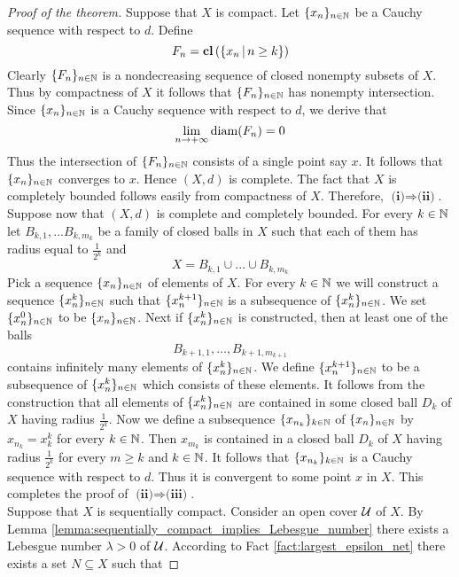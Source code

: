 \begin{proof}[Proof of the theorem]
Suppose that $X$ is compact. Let $\{x_n\}_{n\in {\mathbb N}}$ be a Cauchy sequence with respect to $d$. Define 
$$F_n = \mathbf{cl}\left(\{x_n\,|\,n \geq k\}\right)$$
Clearly $\{F_n\}_{n\in {\mathbb N}}$ is a nondecreasing sequence of closed nonempty subsets of $X$. Thus by compactness of $X$ it follows that $\{F_n\}_{n\in {\mathbb N}}$ has nonempty intersection. Since $\{x_n\}_{n\in {\mathbb N}}$ is a Cauchy sequence with respect to $d$, we derive that
$$\lim_{n\rightarrow +\infty}\mathrm{diam}(F_n) = 0$$
Thus the intersection of $\{F_n\}_{n\in {\mathbb N}}$ consists of a single point say $x$. It follows that $\{x_n\}_{n\in {\mathbb N}}$ converges to $x$. Hence $(X,d)$ is complete. The fact that $X$ is completely bounded follows easily from compactness of $X$. Therefore, $\textbf{(i)}\Rightarrow \textbf{(ii)}$.\\
Suppose now that $(X,d)$ is complete and completely bounded. For every $k\in {\mathbb N}$ let $B_{k,1},...B_{k,m_k}$ be a family of closed balls in $X$ such that each of them has radius equal to $\frac{1}{2^k}$ and
$$X = B_{k,1}\cup ...\cup B_{k,m_k}$$
Pick a sequence $\{x_n\}_{n\in {\mathbb N}}$ of elements of $X$. For every $k \in {\mathbb N}$ we will construct a sequence $\{x^{k}_n\}_{n\in {\mathbb N}}$ such that $\{x^{k+1}_n\}_{n\in {\mathbb N}}$ is a subsequence of $\{x^{k}_{n}\}_{n \in {\mathbb N}}$. We set $\{x^{0}_n\}_{n\in {\mathbb N}}$ to be $\{x_n\}_{n\in {\mathbb N}}$. Next if $\{x^k_n\}_{n\in {\mathbb N}}$ is constructed, then at least one of the balls 
$$B_{k+1,1},...,B_{k+1,m_{k+1}}$$
contains infinitely many elements of $\{x^k_n\}_{n\in {\mathbb N}}$. We define $\{x^{k+1}_n\}_{n\in {\mathbb N}}$ to be a subsequence of $\{x^k_n\}_{n\in {\mathbb N}}$ which consists of these elements. It follows from the construction that all elements of $\{x^k_n\}_{n\in {\mathbb N}}$ are contained in some closed ball $D_k$ of $X$ having radius $\frac{1}{2^{k}}$. Now we define a subsequence $\{x_{n_k}\}_{k\in {\mathbb N}}$ of $\{x_n\}_{n\in {\mathbb N}}$ by $x_{n_k} = x^k_k$ for every $k\in {\mathbb N}$. Then $x_{m_k}$ is contained in a closed ball $D_k$ of $X$ having radius $\frac{1}{2^{k}}$ for every $m\geq k$ and $k\in {\mathbb N}$. It follows that $\{x_{n_k}\}_{k\in {\mathbb N}}$ is a Cauchy sequence with respect to $d$. Thus it is convergent to some point $x$ in $X$. This completes the proof of $\textbf{(ii)}\Rightarrow \textbf{(iii)}$.\\
Suppose that $X$ is sequentially compact. Consider an open cover ${\mathcal U}$ of $X$. By Lemma \ref{lemma:sequentially_compact_implies_Lebesgue_number} there exists a Lebesgue number $\lambda > 0$ of ${\mathcal U}$. According to Fact \ref{fact:largest_epsilon_net} there exists a set $N\subseteq X$ such that

\end{proof}
